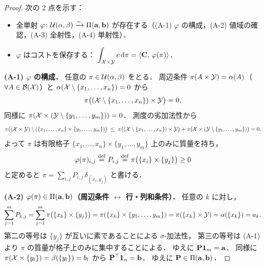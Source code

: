 \begin{proof}
  次の 2 点を示す：
  \begin{itemize}
    \item[(A)] 全単射 $\varphi \colon \mathcal{U}(\alpha,\beta) \xrightarrow{\sim} \Pi(\mathbf{a},\mathbf{b})$
      が存在する（(A-1) $\varphi$ の構成，(A-2) 値域の確認，(A-3) 全射性，(A-4) 単射性）．
    \item[(B)] $\varphi$ はコストを保存する：
      $\displaystyle\int_{\mathcal{X}\times\mathcal{Y}} c\,\mathrm{d}\pi = \langle \mathbf{C},\, \varphi(\pi) \rangle$．
  \end{itemize}
  \medskip
  \textbf{(A-1) $\varphi$ の構成．}
  任意の $\pi \in \mathcal{U}(\alpha, \beta)$ をとる．
  周辺条件 $\pi(A \times \mathcal{Y}) = \alpha(A)$（$\forall A \in \mathcal{B}(\mathcal{X})$）と
  $\alpha(\mathcal{X} \setminus \{x_1,\ldots,x_n\}) = 0$ から
  \[
    \pi\bigl((\mathcal{X} \setminus \{x_1,\ldots,x_n\}) \times \mathcal{Y}\bigr) = 0,
  \]
  同様に $\pi(\mathcal{X} \times (\mathcal{Y} \setminus \{y_1,\ldots,y_m\})) = 0$．
  測度の劣加法性から
  \[
    \pi\bigl((\mathcal{X}\times\mathcal{Y})\setminus(\{x_1,\ldots,x_n\}\times\{y_1,\ldots,y_m\})\bigr)
    \;\leq\;
    \pi\bigl((\mathcal{X}\setminus\{x_1,\ldots,x_n\})\times\mathcal{Y}\bigr)
    + \pi\bigl(\mathcal{X}\times(\mathcal{Y}\setminus\{y_1,\ldots,y_m\})\bigr) = 0.
  \]
  よって $\pi$ は有限格子 $\{x_1,\ldots,x_n\} \times \{y_1,\ldots,y_m\}$ 上のみに質量を持ち，
  \[
    \varphi(\pi)_{i,j} \overset{\mathrm{def}}{=} P_{i,j} \overset{\mathrm{def}}{=} \pi\bigl(\{x_i\} \times \{y_j\}\bigr) \geq 0
  \]
  と定めると $\pi = \sum_{i,j} P_{i,j}\, \delta_{(x_i, y_j)}$ と書ける．

  \medskip
  \textbf{(A-2) $\varphi(\pi) \in \Pi(\mathbf{a},\mathbf{b})$（周辺条件 $\leftrightarrow$ 行・列和条件）．}
  任意の $k$ に対し，
  \[
    \sum_{j=1}^m P_{k,j}
    = \sum_{j=1}^m \pi\bigl(\{x_k\} \times \{y_j\}\bigr)
    = \pi\!\left(\{x_k\} \times \{y_1,\ldots,y_m\}\right)
    = \pi(\{x_k\} \times \mathcal{Y})
    = \alpha(\{x_k\}) = a_k.
  \]
  第二の等号は $\{y_j\}$ が互いに素であることによる $\sigma$-加法性，
  第三の等号は (A-1) より $\pi$ の質量が格子上のみに集中することによる．
  ゆえに $\mathbf{P}\mathbf{1}_m = \mathbf{a}$．
  同様に $\pi(\mathcal{X} \times \{y_l\}) = \beta(\{y_l\}) = b_l$ から $\mathbf{P}^\top\mathbf{1}_n = \mathbf{b}$．
  ゆえに $\mathbf{P} \in \Pi(\mathbf{a},\mathbf{b})$．


\end{proof}
